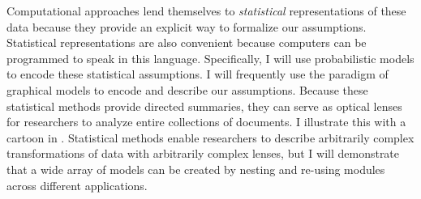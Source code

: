 Computational approaches lend themselves to \emph{statistical}
representations of these data because they provide an explicit way to
formalize our assumptions.  Statistical representations are also
convenient because computers can be programmed to speak in this
language. Specifically, I will use probabilistic models to encode
these statistical assumptions.  I will frequently use the paradigm of
graphical models \citep{pearl:1985} to encode and describe our
assumptions.  Because these statistical methods provide directed
summaries, they can serve as optical lenses for researchers to analyze
entire collections of documents.  I illustrate this with a cartoon in
.  Statistical methods enable researchers to
describe arbitrarily complex transformations of data with arbitrarily
complex lenses, but I will demonstrate that a wide array of models can
be created by nesting and re-using modules across different
applications.

